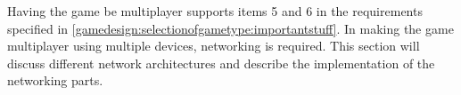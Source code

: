 Having the game be multiplayer supports items 5 and 6 in the requirements specified in \ref{gamedesign:selectionofgametype:importantstuff}.
In making the game multiplayer using multiple devices, networking is required.
This section will discuss different network architectures and describe the implementation of the networking parts.




